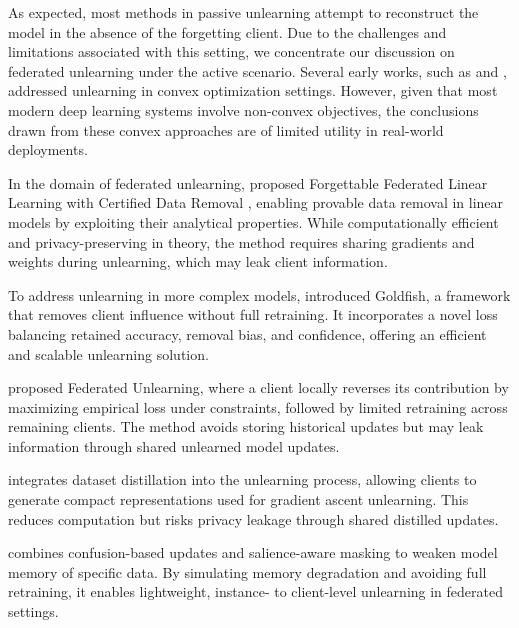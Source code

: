 \documentclass{article}
\begin{document}
As expected, most methods in passive unlearning attempt to reconstruct the model in the absence of the forgetting client. Due to the challenges and limitations associated with this setting, we concentrate our discussion on federated unlearning under the active scenario. Several early works, such as \citep{xiong2023exact} and \citep{xiong2024appro}, addressed unlearning in convex optimization settings. However, given that most modern deep learning systems involve non-convex objectives, the conclusions drawn from these convex approaches are of limited utility in real-world deployments.\par
In the domain of federated unlearning, \citep{jin2024forgettablefederatedlinearlearning} proposed Forgettable Federated Linear Learning with Certified Data Removal , enabling provable data removal in linear models by exploiting their analytical properties. While computationally efficient and privacy-preserving in theory, the method requires sharing gradients and weights during unlearning, which may leak client information.\par

To address unlearning in more complex models,\citep{wang2024goldfishefficientfederatedunlearning} introduced Goldfish, a framework that removes client influence without full retraining. It incorporates a novel loss balancing retained accuracy, removal bias, and confidence, offering an efficient and scalable unlearning solution.\par

\citet{halimi2023federatedunlearningefficientlyerase} proposed Federated Unlearning, where a client locally reverses its contribution by maximizing empirical loss under constraints, followed by limited retraining across remaining clients. The method avoids storing historical updates but may leak information through shared unlearned model updates.\par

\citet{dhasade2024quickdropefficientfederatedunlearning} integrates dataset distillation into the unlearning process, allowing clients to generate compact representations used for gradient ascent unlearning. This reduces computation but risks privacy leakage through shared distilled updates.\par

\citet{10682764}combines confusion-based updates and salience-aware masking to weaken model memory of specific data. By simulating memory degradation and avoiding full retraining, it enables lightweight, instance- to client-level unlearning in federated settings.\par
\end{document}
